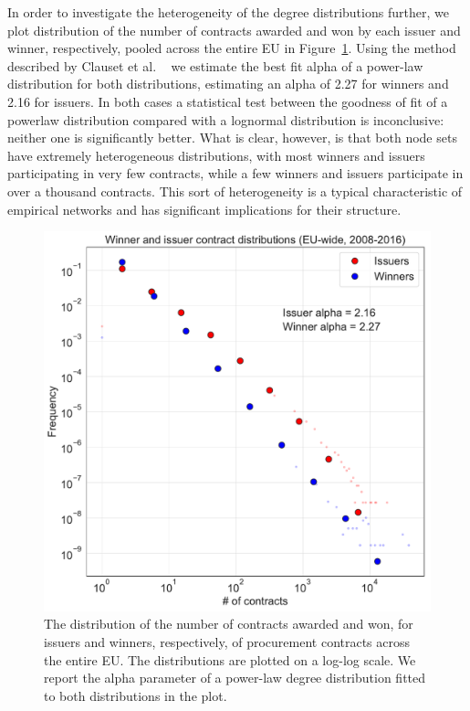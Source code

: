 In order to investigate the heterogeneity of the degree distributions further, we plot distribution of the number of contracts awarded and won by each issuer and winner, respectively, pooled across the entire EU in Figure~\ref{fig:eu_dists}. Using the method described by Clauset et al. ~\cite{clauset2009power,alstott2014powerlaw} we estimate the best fit alpha of a power-law distribution for both distributions, estimating an alpha of 2.27 for winners and 2.16 for issuers. In both cases a statistical test between the goodness of fit of a powerlaw distribution compared with a lognormal distribution is inconclusive: neither one is significantly better. What is clear, however, is that both node sets have extremely heterogeneous distributions, with most winners and issuers participating in very few contracts, while a few winners and issuers participate in over a thousand contracts. This sort of heterogeneity is a typical characteristic of empirical networks and has significant implications for their structure.

\begin{figure}[!t]
\centering
  \includegraphics[width=\textwidth]{images/ted_networks/eu_df_global_dists.pdf}
  \caption[Contract distributions of issuers and winners, EU-wide.]{The distribution of the number of contracts awarded and won, for issuers and winners, respectively, of procurement contracts across the entire EU. The distributions are plotted on a log-log scale. We report the alpha parameter of a power-law degree distribution fitted to both distributions in the plot.}
  \label{fig:eu_dists}
\end{figure}


